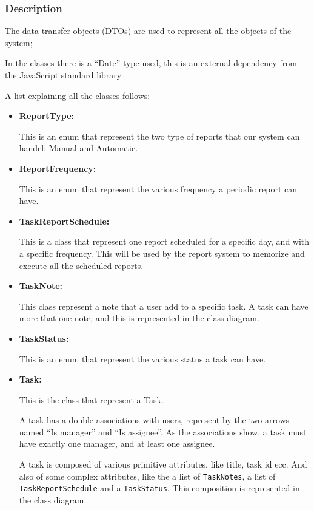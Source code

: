\documentclass{article}
\begin{document}
\subsubsection{Description}

The data transfer objects (DTOs) are used to represent
all the objects of the system;

In the classes there is a ``Date'' type used, this is an external dependency
from the JavaScript standard library

A list explaining all the classes follows:

\begin{itemize}
    \item \textbf{ReportType: }

    This is an enum that represent the two type of reports that our system can handel: Manual and Automatic.

    \item \textbf{ReportFrequency: }

    This is an enum that represent the various frequency a periodic report can have.

    \item \textbf{TaskReportSchedule: }

    This is a class that represent one report scheduled for a specific day, and with a specific frequency.
    This will be used by the report system to memorize and execute all the scheduled reports.

    \item \textbf{TaskNote: }
    
    This class represent a note that a user add to a specific task.
    A task can have more that one note, and this is represented in the class diagram.

    \item \textbf{TaskStatus: }
    
    This is an enum that represent the various status a task can have.

    \item \textbf{Task: }
    
    This is the class that represent a Task.

    A task has a double associations with users, represent by the two arrows named ``Is manager'' and ``Is assignee''.
    As the associations show, a task must have exactly one manager, and at least one assignee.

    A task is composed of various primitive attributes, like title, task id ecc. 
    And also of some complex attributes, like the a list of \texttt{TaskNotes}, a list of \texttt{TaskReportSchedule} 
    and a \texttt{TaskStatus}. This composition is represented in the class diagram. 


\end{itemize}
\end{document}
